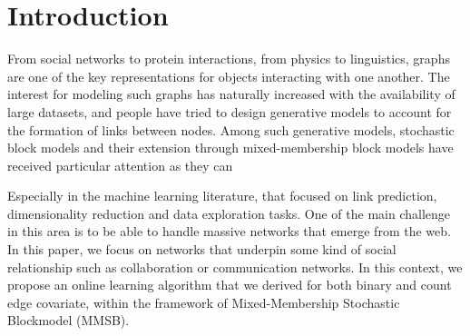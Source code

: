 \section{Introduction}

From social networks to protein interactions, from physics to linguistics, graphs are one of the key representations for objects interacting with one another. The interest for modeling such graphs has naturally increased with the availability of large datasets, and people have tried to design generative models to account for the formation of links between nodes. Among such generative models, stochastic block models and their extension through mixed-membership block models have received particular attention as they can 

Especially in the machine learning literature, that focused on link prediction, dimensionality reduction and data exploration tasks. One of the main challenge in this area is to be able to handle massive networks that emerge from the web. In this paper, we focus on networks that underpin some kind of social relationship such as collaboration or communication networks. In this context, we propose an online learning algorithm that we derived for both binary and count edge covariate, within the framework of Mixed-Membership Stochastic Blockmodel (MMSB).



